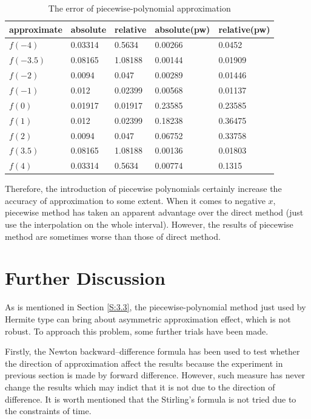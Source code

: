 \documentclass[preprint,12pt]{elsarticle}
\begin{document}
\begin{table}[htb]
\centering
\begin{tabular}{l|l l l l}
\textbf{approximate} & \textbf{absolute} & \textbf{relative} & \textbf{absolute(pw)} & \textbf{relative(pw)}\\
\hline
$f(-4)$ & 0.03314 & 0.5634 & 0.00266 & 0.0452 \\
$f(-3.5)$ & 0.08165 & 1.08188 & 0.00144 & 0.01909 \\
$f(-2)$ & 0.0094 & 0.047 & 0.00289 & 0.01446 \\
$f(-1)$ & 0.012 & 0.02399 & 0.00568 & 0.01137 \\
$f(0)$ & 0.01917 & 0.01917 & 0.23585 & 0.23585 \\
$f(1)$ & 0.012 & 0.02399 & 0.18238 & 0.36475 \\
$f(2)$ & 0.0094 & 0.047 & 0.06752 & 0.33758 \\
$f(3.5)$ & 0.08165 & 1.08188 & 0.00136 & 0.01803 \\
$f(4)$ & 0.03314 & 0.5634 & 0.00774 & 0.1315
\end{tabular}
\caption{The error of piecewise-polynomial approximation}
\label{tab:pw2}
\end{table}

Therefore, the introduction of piecewise polynomials certainly increase the accuracy of approximation to some extent. When it comes to negative $x$, piecewise method has taken an apparent advantage over the direct method (just use the interpolation on the whole interval). However, the results of piecewise method are sometimes worse than those of direct method.

\section{Further Discussion}
\label{S:4}

As is mentioned in Section \ref{S:3.3}, the piecewise-polynomial method just used by Hermite type can bring about asymmetric approximation effect, which is not robust. To approach this problem, some further trials have been made.

Firstly, the Newton backward–difference formula has been used to test whether the direction of approximation affect the results because the experiment in previous section is made by forward difference. However, such measure has never change the results which may indict that it is not due to the direction of difference. It is worth mentioned that the Stirling's formula is not tried due to the constraints of time.
\end{document}
